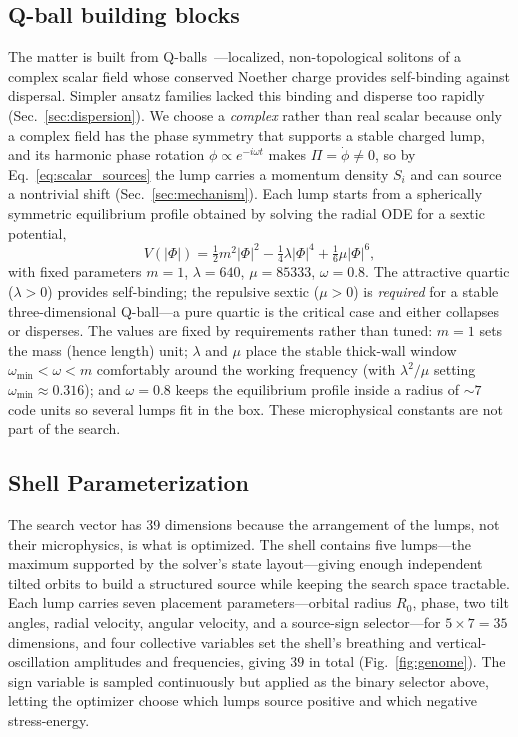 \documentclass[twocolumn,floatfix,aps,prd,nofootinbib]{revtex4-2}
\begin{document}
\subsection{Q-ball building blocks}
\label{sec:qball}

The matter is built from Q-balls~\cite{coleman85,leepang92}---localized,
non-topological solitons of a complex scalar field whose conserved Noether
charge provides self-binding against dispersal. Simpler ansatz families
lacked this binding and disperse too rapidly
(Sec.~\ref{sec:dispersion}). We choose a \emph{complex} rather than
real scalar because only a complex field has the phase symmetry that supports
a stable charged lump, and its harmonic phase rotation
$\phi\propto e^{-i\omega t}$ makes $\Pi=\dot\phi\neq0$, so by
Eq.~\eqref{eq:scalar_sources} the lump carries a momentum density $S_i$ and can
source a nontrivial shift (Sec.~\ref{sec:mechanism}). Each lump
starts from a spherically symmetric equilibrium profile obtained by solving the
radial ODE for a sextic potential,
\begin{equation}
V(|\Phi|)=\tfrac12 m^2|\Phi|^2 - \tfrac14\lambda|\Phi|^4
          +\tfrac16\mu|\Phi|^6,
\label{eq:sextic}
\end{equation}
with fixed parameters $m=1$, $\lambda=640$, $\mu=85333$, $\omega=0.8$.
The attractive quartic ($\lambda>0$) provides self-binding; the repulsive
sextic ($\mu>0$) is \emph{required} for a stable three-dimensional Q-ball---a
pure quartic is the critical case and either collapses or disperses.
The values are fixed by requirements rather than tuned: $m=1$ sets the mass
(hence length) unit; $\lambda$ and $\mu$ place the stable thick-wall window
$\omega_{\min}<\omega<m$ comfortably around the working frequency (with
$\lambda^2/\mu$ setting $\omega_{\min}\approx0.316$); and $\omega=0.8$ keeps
the equilibrium profile inside a radius of ${\sim}7$ code units so several
lumps fit in the box. These microphysical constants are not part of the search.

\subsection{Shell Parameterization}
\label{sec:shell}

The search vector has 39 dimensions because the arrangement of the lumps, not
their microphysics, is what is optimized. The shell contains five lumps---the
maximum supported by the solver's state layout---giving enough independent
tilted orbits to build a structured source while keeping the search space
tractable. Each lump carries seven placement parameters---orbital radius $R_0$,
phase, two tilt angles, radial velocity, angular velocity, and a source-sign
selector---for $5\times7=35$ dimensions, and four collective variables set the
shell's breathing and vertical-oscillation amplitudes and frequencies, giving
$39$ in total (Fig.~\ref{fig:genome}). The sign variable is sampled
continuously but applied as the binary selector above, letting the optimizer
choose which lumps source positive and which negative stress-energy.
\end{document}
